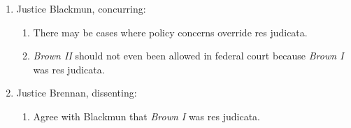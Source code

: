 \begin{enumerate}
\begin{enumerate}
        beyond any individual judge's determination of the equities in a 
        particular case.''\footnote{Casebook p. 1229.}
        \item Reversed.
    \end{enumerate}
    \item Justice Blackmun, concurring:
    \begin{enumerate}
        \item There may be cases where policy concerns override res judicata.
        \item \emph{Brown II} should not even been allowed in federal court 
        because \emph{Brown I} was res judicata.
    \end{enumerate}
    \item Justice Brennan, dissenting:
    \begin{enumerate}
        \item Agree with Blackmun that \emph{Brown I} was res judicata.
    \end{enumerate}
\end{enumerate}
